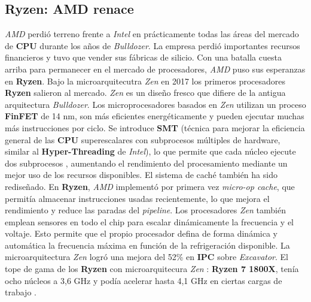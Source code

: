 \subsection{Ryzen: AMD renace}
\emph{AMD} perdió terreno frente a \emph{Intel} en prácticamente todas las áreas del mercado de \textbf{CPU} durante los años de \emph{Bulldozer}. 
La empresa perdió importantes recursos financieros y tuvo que vender sus fábricas de silicio. Con una batalla cuesta arriba para 
permanecer en el mercado de procesadores, \emph{AMD} puso sus esperanzas en \textbf{Ryzen}.
Bajo la microarquitecutra \emph{Zen}  en 2017 los primeros procesadores \textbf{Ryzen} salieron al mercado. 
\emph{Zen} es un diseño fresco que difiere de la antigua arquitectura \emph{Bulldozer}. Los microprocesadores basados en \emph{Zen} utilizan un proceso \textbf{FinFET} de 14 nm,  
son más eficientes energéticamente y pueden ejecutar muchas más instrucciones por ciclo. Se introduce \textbf{SMT}
(técnica para mejorar la eficiencia general de las \textbf{CPU} superescalares con subprocesos múltiples de hardware, similar al \textbf{Hyper-Threading} de \emph{Intel}), lo que permite que cada núcleo ejecute dos subprocesos
, aumentando el rendimiento del procesamiento mediante un mejor uso de los recursos disponibles.
El sistema de caché también ha sido rediseñado. En \textbf{Ryzen}, \emph{AMD} implementó por primera vez \emph{micro-op cache}, que permitía almacenar instrucciones usadas recientemente, 
lo que mejora el rendimiento y reduce las paradas del \emph{pipeline}.
Los procesadores \emph{Zen} también emplean sensores en todo el chip para escalar dinámicamente la frecuencia y el voltaje. Esto permite que el propio procesador defina de forma 
dinámica y automática la frecuencia máxima en función de la refrigeración disponible.
La microarquitectura \emph{Zen} logró una mejora del 52\% en \textbf{IPC} sobre \emph{Excavator}. 
El tope de gama de los \textbf{Ryzen} con microarquitecura \emph{Zen} : \textbf{Ryzen 7 1800X}, tenía ocho núcleos  a 3,6 GHz y podía acelerar hasta 4,1 GHz en ciertas cargas de trabajo 
.

